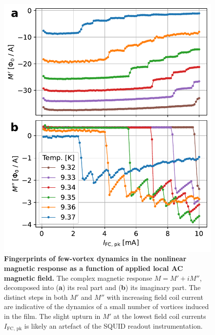 \documentclass[%
 reprint,
 superscriptaddress,
 amsmath,
 amssymb,
 amsfonts,
 aps,
 prb,
]{revtex4-2}
\newcommand{\FC}{\mathrm{FC}}
\newcommand{\pk}{\mathrm{pk}}
\begin{document}
\begin{figure}
    \centering
    \includegraphics[width=\linewidth]{figures/M-vs_I_fc.pdf}
    \caption{{\bf Fingerprints of few-vortex dynamics in the nonlinear magnetic response as a function of applied local AC magnetic field.} The complex magnetic response $M=M'+iM''$, decomposed into ({\bf a}) its real part and ({\bf b}) its imaginary part. The distinct steps in both $M'$ and $M''$ with increasing field coil current are indicative of the dynamics of a small number of vortices induced in the film. The slight upturn in $M'$ at the lowest field coil currents $I_{\FC,\,\pk}$ is likely an artefact of the SQUID readout instrumentation.}
    \label{fig:M-vs-Ifc}
\end{figure}
\end{document}
